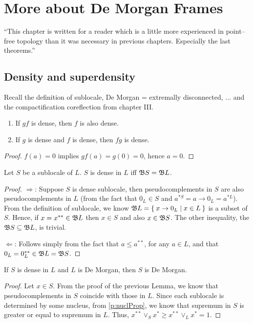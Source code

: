\chapter{More about De Morgan Frames}

``This chapter is written for a reader which is a little more experienced in point--free topology than it was necessary in previous chapters. Especially the last theorems.''

\section{Density and superdensity}
Recall the definition of sublocale, De Morgan = extremally disconnected, ...
and the compactification coreflection from chapter III.

\begin{lemma}\label{p:denseProperties}
    \begin{enumerate}
        \item If $gf$ is dense, then $f$ is also dense.
        \item If $g$ is dense and $f$ is dense, then $fg$ is dense.
    \end{enumerate}
\end{lemma}
\begin{proof}
    $f(a) = 0$ implies $gf(a) = g(0) = 0$, hence $a = 0$.
\end{proof}

\begin{lemma}\label{p:denseProperties2}
    Let $S$ be a sublocale of $L$. $S$ is dense in $L$ iff $\mathfrak{B} S = \mathfrak{B} L$.
\end{lemma}
\begin{proof}
    $\Rightarrow$: Suppose $S$ is dense sublocale, then pseudocomplements in $S$ are also pseudocomplements in $L$ (from the fact that $0_L\in S$ and $a^{*S} = a\to 0_L = a^{*L}$).
    From the definition of sublocale, we know $\mathfrak{B} L = \Set{ x\to 0_L | x\in L}$ is a subset of $S$. Hence, if $x = x^{**}\in \mathfrak{B} L$ then $x \in S$ and also $x \in \mathfrak{B} S$. The other inequality, the $\mathfrak{B} S\subseteq \mathfrak{B} L$, is trivial.

    $\Leftarrow$: Follows simply from the fact that $a\leq a^{**}$, for any $a\in L$, and that $0_L = 0_L^{**} \in \mathfrak{B} L = \mathfrak{B} S$.
\end{proof}

\begin{proposition}\label{p:denseReflectDeMorgan}
    If $S$ is dense in $L$ and $L$ is De Morgan, then $S$ is De Morgan.
\end{proposition}
\begin{proof}
    Let $x\in S$. From the proof of the previous Lemma, we know that pseudocomplements in $S$ coincide with those in $L$. Since each sublocale is determined by some nucleus, from \ref{p:nuclProp}, we know that supremum in $S$ is greater or equal to supremum in $L$. Thus, $x^{**}\vee_S x^* \geq x^{**}\vee_L x^* = 1$.
\end{proof}

